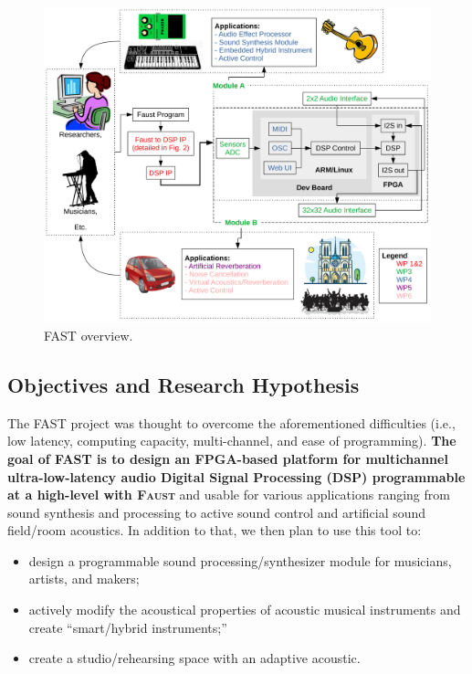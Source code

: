 \documentclass[a4paper,9pt]{extarticle}
\newcommand{\F}{\textsc{Faust}}
\newcommand{\PP}{FAST}
\begin{document}
\begin{figure}[h]
  \centering
  \includegraphics[width=13cm]{img/overview}
  \caption{\PP{} overview.}
  \label{fig:overview}
\end{figure}

\subsection{Objectives and Research Hypothesis}

The \PP{} project was thought to overcome the aforementioned difficulties (i.e., low latency, computing capacity, multi-channel, and ease of programming). \textbf{The goal of \PP{} is to design an FPGA-based platform for multichannel ultra-low-latency audio Digital Signal Processing (DSP) programmable at a high-level with \F{}} and usable for various applications ranging from sound synthesis and processing to active sound control and artificial sound field/room acoustics. In addition to that, we then plan to use this tool to: 

\begin{itemize}
  \itemsep0em
  \item design a programmable sound processing/synthesizer module for musicians, artists, and makers; 
  \item actively modify the acoustical properties of acoustic musical instruments and create ``smart/hybrid instruments;''
   \item create a studio/rehearsing space with an adaptive acoustic.
\end{itemize}
\end{document}
